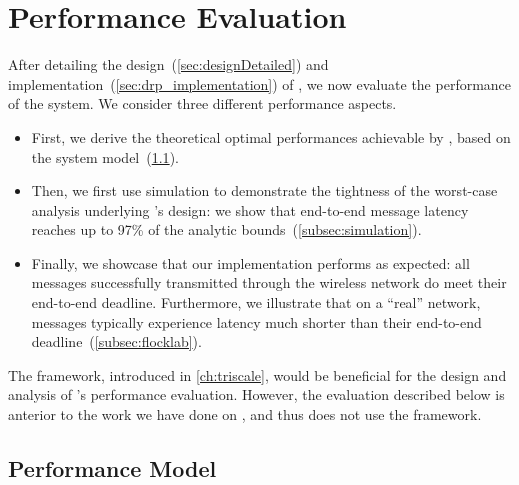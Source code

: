 
\section{Performance Evaluation}
\label{sec:drp_evaluation}

After detailing the design~(\cref{sec:designDetailed}) and implementation~(\cref{sec:drp_implementation}) of \DRP, we now evaluate the performance of the system. We consider three different performance aspects.

\begin{itemize}
	\item
	First, we derive the theoretical optimal performances achievable by \DRP, based on the system model~(\cref{subsec:perf_model}).

	\item
	Then, we first use simulation to demonstrate the tightness of the worst-case analysis underlying \DRP's design: we show that end-to-end message latency reaches up to 97\% of the analytic bounds~(\cref{subsec:simulation}).

	\item
	Finally, we showcase that our \DRP implementation performs as expected: all messages successfully transmitted through the wireless network do meet their end-to-end deadline. Furthermore, we illustrate that on a ``real'' network, messages typically experience latency much shorter than their end-to-end deadline~(\cref{subsec:flocklab}).
\end{itemize}


\begin{remark}
	The \triscale framework, introduced in \cref{ch:triscale}, would be beneficial for the design and analysis of \DRP's performance evaluation.
	However, the evaluation described below is anterior to the work we have done on \triscale, and thus does not use the framework.
\end{remark}


\subsection{Performance Model}
\label{subsec:perf_model}

